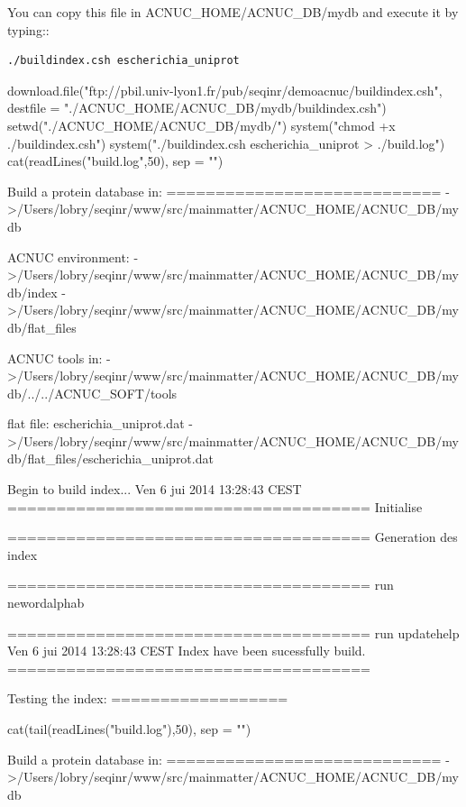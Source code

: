 \documentclass{article}
\begin{document}
\begin{itemize}
You can copy this file in ACNUC\_HOME/ACNUC\_DB/mydb and execute it by typing::

\begin{verbatim}
./buildindex.csh escherichia_uniprot
\end{verbatim}

\begin{Schunk}
\begin{Sinput}
 download.file("ftp://pbil.univ-lyon1.fr/pub/seqinr/demoacnuc/buildindex.csh",
 destfile = "./ACNUC_HOME/ACNUC_DB/mydb/buildindex.csh")
 setwd("./ACNUC_HOME/ACNUC_DB/mydb/")
 system("chmod +x ./buildindex.csh")
 system("./buildindex.csh escherichia_uniprot >  ./build.log")
 cat(readLines("build.log",50), sep = "\n")
\end{Sinput}
\begin{Soutput}
 Build a protein database in:
 ============================
 ->/Users/lobry/seqinr/www/src/mainmatter/ACNUC_HOME/ACNUC_DB/mydb
 
ACNUC environment:
 ->/Users/lobry/seqinr/www/src/mainmatter/ACNUC_HOME/ACNUC_DB/mydb/index
 ->/Users/lobry/seqinr/www/src/mainmatter/ACNUC_HOME/ACNUC_DB/mydb/flat_files
 
ACNUC tools in:
 ->/Users/lobry/seqinr/www/src/mainmatter/ACNUC_HOME/ACNUC_DB/mydb/../../ACNUC_SOFT/tools
 
flat file: escherichia_uniprot.dat
 ->/Users/lobry/seqinr/www/src/mainmatter/ACNUC_HOME/ACNUC_DB/mydb/flat_files/escherichia_uniprot.dat
 
Begin to build index...
Ven  6 jui 2014 13:28:43 CEST
=====================================
Initialise

=====================================
Generation des index

=====================================
run newordalphab


=====================================
run updatehelp
Ven  6 jui 2014 13:28:43 CEST
Index have been sucessfully build.
=====================================
 
Testing the index:
==================
\end{Soutput}
\begin{Sinput}
 cat(tail(readLines("build.log"),50), sep = "\n")
\end{Sinput}
\begin{Soutput}
 Build a protein database in:
 ============================
 ->/Users/lobry/seqinr/www/src/mainmatter/ACNUC_HOME/ACNUC_DB/mydb
 

\end{Soutput}
\end{Schunk}
\end{itemize}
\end{document}
